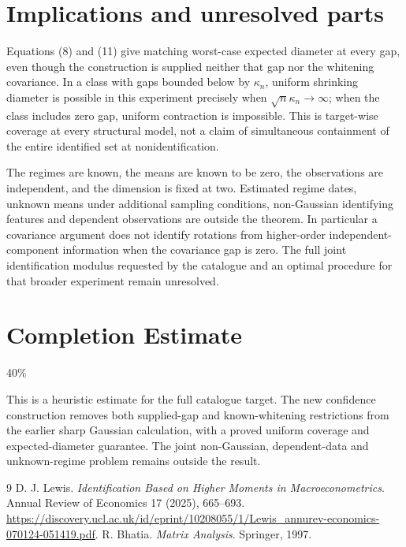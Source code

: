 \documentclass[11pt]{article}
\theoremstyle{definition}
\begin{document}
\section*{Implications and unresolved parts}
Equations (8) and (11) give matching worst-case expected diameter at
every gap, even though the construction is supplied neither that gap
nor the whitening covariance. In a class with gaps bounded below by
$\kappa_n$, uniform shrinking diameter is possible in this experiment
precisely when $\sqrt n\kappa_n\to\infty$; when the class includes
zero gap, uniform contraction is impossible. This is target-wise
coverage at every structural model, not a claim of simultaneous
containment of the entire identified set at nonidentification.

The regimes are known, the means are known to be zero, the observations
are independent, and the dimension is fixed at two. Estimated regime
dates, unknown means under additional sampling conditions, non-Gaussian
identifying features and dependent observations are outside the theorem.
In particular a covariance argument does not identify rotations from
higher-order independent-component information when the covariance gap
is zero. The full joint identification modulus requested by the catalogue
and an optimal procedure for that broader experiment remain unresolved.

\section{Completion Estimate}
40\%

This is a heuristic estimate for the full catalogue target. The new
confidence construction removes both supplied-gap and known-whitening
restrictions from the earlier sharp Gaussian calculation, with a proved
uniform coverage and expected-diameter guarantee. The joint non-Gaussian,
dependent-data and unknown-regime problem remains outside the result.

\begin{thebibliography}{9}
 D. J. Lewis.
\emph{Identification Based on Higher Moments in Macroeconometrics}.
Annual Review of Economics 17 (2025), 665--693.
\url{https://discovery.ucl.ac.uk/id/eprint/10208055/1/Lewis_annurev-economics-070124-051419.pdf}.
 R. Bhatia.
\emph{Matrix Analysis}.
Springer, 1997.
\end{thebibliography}
\end{document}
